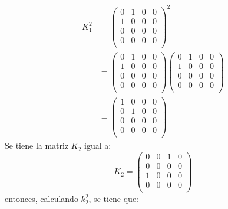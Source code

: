     \begin{align*}
        K_1^2 &=\left( \begin{matrix}
            0 & 1 & 0 & 0 \\
            1 & 0 & 0 & 0 \\
            0 & 0 & 0 & 0 \\
            0 & 0 & 0 & 0 \\
        \end{matrix}\right)^2 \\
        & =\left( \begin{matrix}
            0 & 1 & 0 & 0 \\
            1 & 0 & 0 & 0 \\
            0 & 0 & 0 & 0 \\
            0 & 0 & 0 & 0 \\
        \end{matrix}\right)\left( \begin{matrix}
            0 & 1 & 0 & 0 \\
            1 & 0 & 0 & 0 \\
            0 & 0 & 0 & 0 \\
            0 & 0 & 0 & 0 \\
        \end{matrix}\right)\\
        & =\left( \begin{matrix}
            1 & 0 & 0 & 0 \\
            0 & 1 & 0 & 0 \\
            0 & 0 & 0 & 0 \\
            0 & 0 & 0 & 0 \\
        \end{matrix}\right)
    \end{align*}
    Se tiene la matriz $K_2$ igual a:
    \begin{equation*}
        K_2 =\left( \begin{matrix}
            0 & 0 & 1 & 0 \\
            0 & 0 & 0 & 0 \\
            1 & 0 & 0 & 0 \\
            0 & 0 & 0 & 0 \\
        \end{matrix}\right)
    \end{equation*}
    entonces, calculando $k_2^2$, se tiene que:
